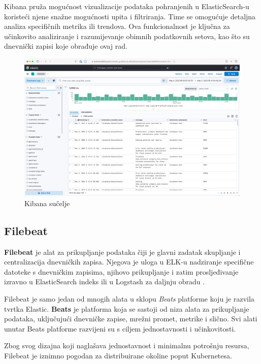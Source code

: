 \documentclass[times, utf8, diplomski]{fer}
\begin{document}
Kibana pruža mogućnost vizualizacije podataka pohranjenih u ElasticSearch-u koristeći njene snažne mogućnosti upita i filtriranja. Time se omogućuje detaljna analiza specifičnih metrika ili trendova. Ova funkcionalnost je ključna za učinkovito analiziranje i razumijevanje obimnih podatkovnih setova, kao što su dnevnički zapisi koje obrađuje ovaj rad.

\begin{figure}[htb]
	\centering
	\includegraphics[width=15cm]{images/elastic-logs.png}
	\caption[Kibana sučelje]{Kibana sučelje}
	\label{fig:kibana}
\end{figure}

\subsection{Filebeat}
\label{sec:filebeat}

\textbf{Filebeat} je alat za prikupljanje podataka čiji je glavni zadatak skupljanje i centralizacija dnevničkih zapisa. Njegova je uloga u ELK-u nadziranje specifične datoteke s dnevničkim zapisima, njihovo prikupljanje i zatim prosljeđivanje izravno u ElasticSearch indeks ili u Logstash za daljnju obradu \citep{konda_elasticsearch_2023}. 

Filebeat je samo jedan od mnogih alata u sklopu \emph{Beats} platforme koju je razvila tvrtka Elastic. \textbf{Beats} je platforma koja se sastoji od niza alata za prikupljanje podataka, uključujući dnevničke zapise, mrežni promet, metrike i slično. Svi alati unutar Beats platforme razvijeni su s ciljem jednostavnosti i učinkovitosti. 

Zbog svog dizajna koji naglašava jednostavnost i minimalnu potrošnju resursa, Filebeat je iznimno pogodan za distribuirane okoline poput Kubernetesa.\\
\end{document}

